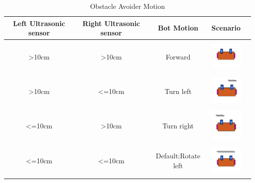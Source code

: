 \begin{table}
    \renewcommand{\arraystretch}{3.5}
    \centering
    \begin{tabular}{|c|c|c|c|c|}
    \hline
        \textbf{Left Ultrasonic sensor} & \textbf{Right Ultrasonic sensor} & \textbf{Bot Motion} & \textbf{Scenario} \\ \hline
        >10cm & >10cm & Forward & \begin{minipage}{.2\textwidth}
            \centering
            \includegraphics[width=16mm, height=16mm]{Images/Ultrasonic/ultraSonic_objAvoider_straight.png}
            \vspace{1mm}
        \end{minipage} \\ \hline
        >10cm & <=10cm & Turn left & \begin{minipage}{.2\textwidth}
            \centering
            \includegraphics[width=16mm, height=16mm]{Images/Ultrasonic/ultraSonic_objAvoider_left.png.png}
            \vspace{1mm}
        \end{minipage}  \\ \hline
        <=10cm & >10cm & Turn right & \begin{minipage}{.2\textwidth}
            \centering
            \includegraphics[width=16mm, height=16mm]{Images/Ultrasonic/ultraSonic_objAvoider_right.png}
            \vspace{1mm}
        \end{minipage}  \\ \hline
        <=10cm & <=10cm & Default:Rotate left & \begin{minipage}{.2\textwidth}
            \centering
            \includegraphics[width=16mm, height=16mm]{Images/Ultrasonic/ultraSonic_objAvoider_rotate.png}
            \vspace{1mm}
        \end{minipage}  \\ \hline
    \end{tabular}
    \vspace{9mm}
    \caption{Obstacle Avoider Motion}
    \label{tab: obj_avoider_motion}
\end{table}

